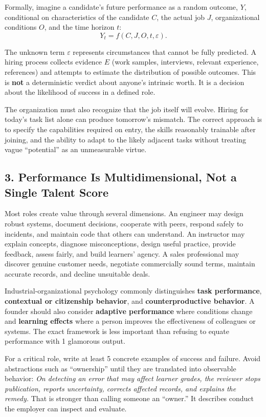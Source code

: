 Formally, imagine a candidate's future performance as a random outcome, $Y$, conditional on characteristics of the candidate $C$, the actual job $J$, organizational conditions $O$, and the time horizon $t$:
\begin{equation}
Y_{t} = f(C, J, O, t, \varepsilon).
\end{equation}

The unknown term $\varepsilon$ represents circumstances that cannot be fully predicted. A hiring process collects evidence $E$ (work samples, interviews, relevant experience, references) and attempts to estimate the distribution of possible outcomes. This is \textbf{not} a deterministic verdict about anyone's intrinsic worth. It is a decision about the likelihood of success in a defined role.

The organization must also recognize that the job itself will evolve. Hiring for today's task list alone can produce tomorrow's mismatch. The correct approach is to specify the capabilities required on entry, the skills reasonably trainable after joining, and the ability to adapt to the likely adjacent tasks without treating vague ``potential'' as an unmeasurable virtue.

\subsection*{3. Performance Is Multidimensional, Not a Single Talent Score}

Most roles create value through several dimensions. An engineer may design robust systems, document decisions, cooperate with peers, respond safely to incidents, and maintain code that others can understand. An instructor may explain concepts, diagnose misconceptions, design useful practice, provide feedback, assess fairly, and build learners' agency. A sales professional may discover genuine customer needs, negotiate commercially sound terms, maintain accurate records, and decline unsuitable deals.

Industrial-organizational psychology commonly distinguishes \textbf{task performance}, \textbf{contextual or citizenship behavior}, and \textbf{counterproductive behavior}. A founder should also consider \textbf{adaptive performance} where conditions change and \textbf{learning effects} where a person improves the effectiveness of colleagues or systems. The exact framework is less important than refusing to equate performance with 1 glamorous output.

For a critical role, write at least 5 concrete examples of success and failure. Avoid abstractions such as ``ownership'' until they are translated into observable behavior: \textit{On detecting an error that may affect learner grades, the reviewer stops publication, reports uncertainty, corrects affected records, and explains the remedy.} That is stronger than calling someone an ``owner.'' It describes conduct the employer can inspect and evaluate.

